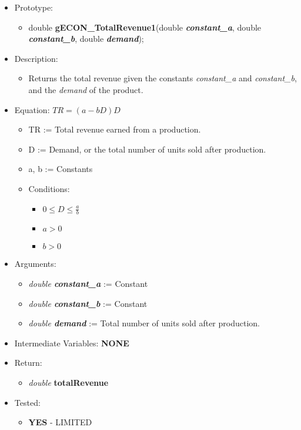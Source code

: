 \documentclass{article}
\begin{document}
{{{{{{\begin{itemize}
\item Prototype:
	\begin{itemize}
	\item double \textbf{gECON\_TotalRevenue1}(double \textbf{\textit{constant\_a}}, double \textbf{\textit{constant\_b}}, double \textbf{\textit{demand}});
	\end{itemize}
\item Description:
	\begin{itemize}
	\item Returns the total revenue given the constants \textit{constant\_a} and \textit{constant\_b},  and the \textit{demand} of the product.
	\end{itemize}
\item Equation:     $TR = (a - bD)D$
	\begin{itemize}[noitemsep]
	\item TR := Total revenue earned from a production.
	\item D := Demand, or the total number of units sold after production.
	\item a, b := Constants
	\item Conditions:
		\begin{itemize}
		\item $0 \le D \le \frac{a}{b}$
		\item $a > 0$
		\item $b > 0$
		\end{itemize}
	\end{itemize}
\item Arguments:
	\begin{itemize}[noitemsep]
	\item \textit{double \textbf{constant\_a}} := Constant
	\item \textit{double \textbf{constant\_b}} := Constant
	\item \textit{double \textbf{demand}} := Total number of units sold after production.
	\end{itemize} 
\item Intermediate Variables: \textbf{NONE}
\item Return:
	\begin{itemize}
	\item \textit{double} \textbf{totalRevenue}
	\end{itemize}
\item Tested:
	\begin{itemize}
	\item \textbf{YES} - LIMITED
	\end{itemize}
\end{itemize}

}}}}}}
\end{document}
